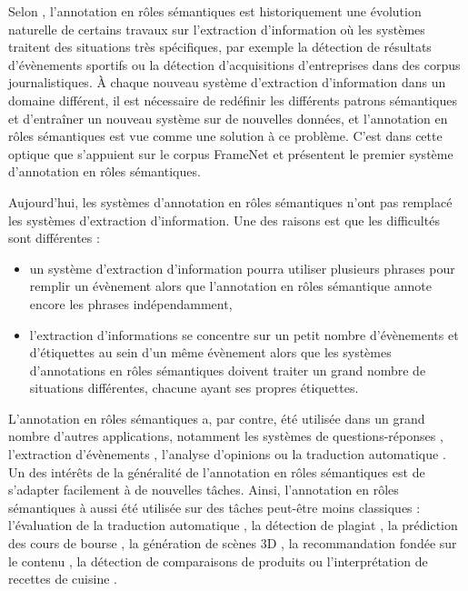 Selon \cite{gildea2002automatic}, l'annotation en rôles sémantiques est
historiquement une évolution naturelle de certains travaux sur l'extraction
d'information où les systèmes traitent des situations très spécifiques, par
exemple la détection de résultats d'évènements sportifs ou la détection
d'acquisitions d'entreprises dans des corpus journalistiques. À chaque nouveau
système d'extraction d'information dans un domaine différent, il est nécessaire
de redéfinir les différents patrons sémantiques et d'entraîner un nouveau
système sur de nouvelles données, et l'annotation en rôles sémantiques est vue
comme une solution à ce problème. C'est dans cette optique que
\cite{gildea2002automatic} s'appuient sur le corpus FrameNet et présentent le
premier système d'annotation en rôles sémantiques.

Aujourd'hui, les systèmes d'annotation en rôles sémantiques n'ont pas remplacé
les systèmes d'extraction d'information. Une des raisons est que les
difficultés sont différentes \citep{boros2014etiquetage} :

\begin{itemize}
    \item un système d'extraction d'information pourra utiliser plusieurs
        phrases pour remplir un évènement alors que l'annotation en rôles
        sémantique annote encore les phrases indépendamment,
    \item l'extraction d'informations se concentre sur un petit nombre
        d'évènements et d'étiquettes au sein d'un même évènement alors que les
        systèmes d'annotations en rôles sémantiques doivent traiter un grand
        nombre de situations différentes, chacune ayant ses propres étiquettes.
\end{itemize}

L'annotation en rôles sémantiques a, par contre, été utilisée dans un grand
nombre d'autres applications, notamment les systèmes de questions-réponses
\citep{shen2007using}, l'extraction d'évènements \citep{exner2011using},
l'analyse d'opinions \citep{das2012structure} ou la traduction automatique
\citep{bazrafshan2013semantic,bazrafshan2014comparing}. Un des intérêts de la
généralité de l'annotation en rôles sémantiques est de s'adapter facilement à
de nouvelles tâches. Ainsi, l'annotation en rôles sémantiques à aussi été
utilisée sur des tâches peut-être moins classiques : l'évaluation de la
traduction automatique \citep{lo2011meant,chuchunkov2014applying}, la détection
de plagiat \citep{osman2012improved}, la prédiction des cours de bourse
\citep{xie2013semantic}, la génération de scènes 3D \citep{chang2014learning},
la recommandation fondée sur le contenu \citep{de2014exploiting}, la détection
de comparaisons de produits \citep{kessler2013detection} ou l'interprétation de
recettes de cuisine \citep{malmaud2014cooking}.

